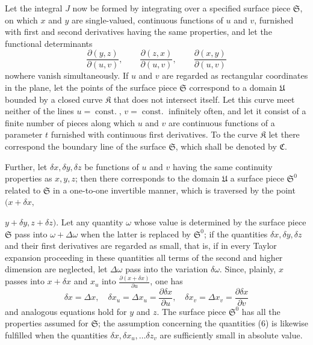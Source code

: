 \documentclass[11pt,a4paper,leqno]{article}
\begin{document}
Let the integral $J$ now be formed by integrating over a
specified surface piece $\mathfrak{S}$, on which $x$ and $y$ are single-valued,
continuous functions of $u$ and $v$, furnished with first and
second derivatives having the same properties, and let the functional
determinants
\begin{equation}\tag{6}
\frac{\partial(y,z)}{\partial(u,v)},\qquad
\frac{\partial(z,x)}{\partial(u,v)},\qquad
\frac{\partial(x,y)}{\partial(u,v)}
\end{equation}
nowhere vanish simultaneously. If $u$ and $v$ are regarded as rectangular
coordinates in the plane, let the points of the surface piece
$\mathfrak{S}$ correspond to a domain $\mathfrak{U}$ bounded by a closed curve $\mathfrak{K}$
that does not intersect itself. Let this curve meet neither of the lines
$u=\operatorname{const.}$, $v=\operatorname{const.}$ infinitely often, and let it consist of a finite number
of pieces along which $u$ and $v$ are continuous functions of a parameter
$t$ furnished with continuous first derivatives. To the curve $\mathfrak{K}$
let there correspond the boundary line of the surface $\mathfrak{S}$, which
shall be denoted by $\mathfrak{C}$.

Further, let $\delta x,\delta y,\delta z$ be functions of $u$ and $v$ having
the same continuity properties as $x,y,z$; then there corresponds to
the domain $\mathfrak{U}$ a surface piece $\mathfrak{S}^0$ related to $\mathfrak{S}$ in a one-to-one
invertible manner, which is traversed by the point $(x+\delta x,$

$y+\delta y,z+\delta z)$. Let any quantity $\omega$ whose value is determined by
the surface piece $\mathfrak{S}$ pass into $\omega+\Delta\omega$ when the latter is replaced
by $\mathfrak{S}^0$; if the quantities $\delta x,\delta y,\delta z$ and their first derivatives
are regarded as small, that is, if in every Taylor expansion proceeding
in these quantities all terms of the second and higher dimension are
neglected, let $\Delta\omega$ pass into the variation $\delta\omega$. Since, plainly, $x$
passes into $x+\delta x$ and $x_u$ into $\frac{\partial(x+\delta x)}{\partial u}$, one has
\[
\delta x=\Delta x,\quad
\delta x_u=\Delta x_u=\frac{\partial\delta x}{\partial u},\quad
\delta x_v=\Delta x_v=\frac{\partial\delta x}{\partial v}
\]
and analogous equations hold for $y$ and $z$. The surface piece $\mathfrak{S}^0$
has all the properties assumed for $\mathfrak{S}$; the assumption concerning
the quantities (6) is likewise fulfilled when the quantities
$\delta x,\delta x_u,\ldots\delta z_v$ are sufficiently small in absolute value.
\end{document}
